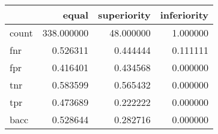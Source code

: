 \begin{tabular}{lrrr}
\toprule
{} &       equal &  superiority &  inferiority \\
\midrule
count &  338.000000 &    48.000000 &     1.000000 \\
fnr   &    0.526311 &     0.444444 &     0.111111 \\
fpr   &    0.416401 &     0.434568 &     0.000000 \\
tnr   &    0.583599 &     0.565432 &     0.000000 \\
tpr   &    0.473689 &     0.222222 &     0.000000 \\
bacc  &    0.528644 &     0.282716 &     0.000000 \\
\bottomrule
\end{tabular}
